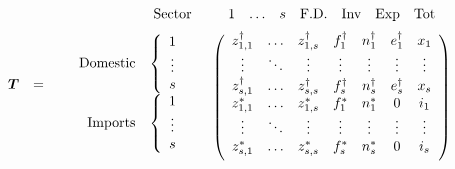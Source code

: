 \documentclass[a4paper]{article}
\begin{document}
\begin{equation}\label{eqn:T}
\begin{array}{rcc}
\boldsymbol{T} & = & \begin{array}{rc}
\begin{array}{cc} \hspace*{17mm} & \mbox{Sector} \end{array} & \begin{array}{ccccccc} 1 & \mathellipsis & s & \mbox{F.D.} & \mbox{Inv} & \mbox{Exp} & \mbox{Tot} \end{array} \vspace*{2mm} \\
\begin{array}{r}
\begin{array}{rc}
\mbox{Domestic} & \left\{ \begin{array}{c}
1 \\
\vdots \\
s
\end{array} \right. \\
\mbox{Imports} & \left\{ \begin{array}{c}
1 \\
\vdots \\
s \\
\end{array} \right.
\end{array} \vspace*{2mm} \\
\end{array} &
\left( \begin{array}{ccccccc}
z^{\dag}_{1,1} & \mathellipsis & z^{\dag}_{1,s} & f^\dag_{1} & n^\dag_{1} & e^\dag_{1} & x_1 \\
\vdots & \ddots & \vdots & \vdots & \vdots & \vdots & \vdots \\
z^{\dag}_{s,1} & \mathellipsis & z^{\dag}_{s,s} & f^\dag_{s} & n^\dag_{s} & e^\dag_{s} & x_{s} \\
z^*_{1,1} & \mathellipsis & z^*_{1,s} & f^*_{1} & n^*_{1} & 0 & i_1 \\
\vdots & \ddots & \vdots & \vdots & \vdots & \vdots & \vdots \\
z^*_{s,1} & \mathellipsis & z^*_{s,s} & f^*_{s} & n^*_{s} & 0 & i_{s} \vspace*{2mm} \\
\end{array} \right)
\end{array}
\end{array}
\end{equation}
\end{document}
